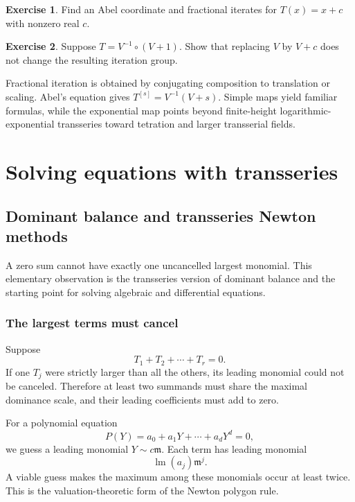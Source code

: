 \documentclass[11pt,openany]{book}
\theoremstyle{definition}
\newtheorem{exercise}{Exercise}[chapter]
\theoremstyle{plain}
\theoremstyle{remark}
\newcommand{\m}{\mathfrak{m}}
\newcommand{\asym}{\sim}
\DeclareMathOperator{\lm}{lm}
\begin{document}
\begin{exercise}
Find an Abel coordinate and fractional iterates for $T(x)=x+c$ with nonzero real $c$.
\end{exercise}

\begin{exercise}
Suppose $T=V^{-1}\circ(V+1)$. Show that replacing $V$ by $V+c$ does not change the resulting iteration group.
\end{exercise}

\begin{summarybox}
Fractional iteration is obtained by conjugating composition to translation or scaling. Abel's equation gives $T^{[s]}=V^{-1}(V+s)$. Simple maps yield familiar formulas, while the exponential map points beyond finite-height logarithmic-exponential transseries toward tetration and larger transserial fields.
\end{summarybox}

\part{Solving equations with transseries}

\chapter{Dominant balance and transseries Newton methods}\label{ch:dominant-balance}

A zero sum cannot have exactly one uncancelled largest monomial. This elementary observation is the transseries version of dominant balance and the starting point for solving algebraic and differential equations.

\section{The largest terms must cancel}

Suppose
\[
 T_1+T_2+\cdots+T_r=0.
\]
If one $T_j$ were strictly larger than all the others, its leading monomial could not be canceled. Therefore at least two summands must share the maximal dominance scale, and their leading coefficients must add to zero.

For a polynomial equation
\[
 P(Y)=a_0+a_1Y+\cdots+a_dY^d=0,
\]
we guess a leading monomial $Y\asym c\m$. Each term has leading monomial
\[
 \lm(a_j)\m^j.
\]
A viable guess makes the maximum among these monomials occur at least twice. This is the valuation-theoretic form of the Newton polygon rule.
\end{document}
